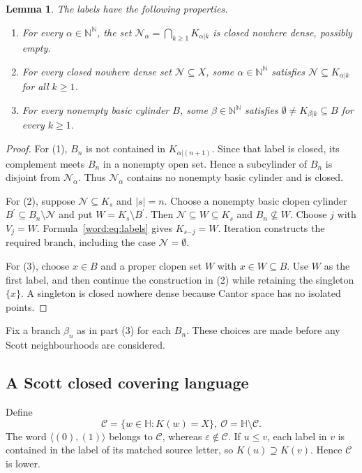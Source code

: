 \documentclass[fleqn,preprint,3p,a4paper]{elsarticle}
\newtheorem{lemma}[theorem]{Lemma}
\theoremstyle{definition}
\newcommand{\N}{\mathbb N}
\newcommand{\HH}{\mathbb H}
\begin{document}
\begin{lemma}\label{word:lem:labels}
The labels have the following properties.
\begin{enumerate}[\rm (1)]
\item For every $\alpha\in\N^\N$, the set
      $\mathcal N_\alpha=\bigcap_{k\geq1}K_{\alpha|k}$ is closed nowhere dense, possibly empty.
\item For every closed nowhere dense set $\mathcal N\subseteq X$, some $\alpha\in\N^\N$ satisfies
      $\mathcal N\subseteq K_{\alpha|k}$ for all $k\geq1$.
\item For every nonempty basic cylinder $B$, some $\beta\in\N^\N$ satisfies
      $\emptyset\neq K_{\beta|k}\subseteq B$ for every $k\geq1$.
\end{enumerate}
\end{lemma}
\begin{proof}
For (1), $B_n$ is not contained in $K_{\alpha|(n+1)}$. Since that label is closed, its complement meets $B_n$ in a nonempty open set. Hence a subcylinder of $B_n$ is disjoint from $\mathcal N_\alpha$. Thus $\mathcal N_\alpha$ contains no nonempty basic cylinder and is closed.

For (2), suppose $\mathcal N\subseteq K_s$ and $|s|=n$. Choose a nonempty basic clopen cylinder $B^\prime\subseteq B_n\setminus\mathcal N$ and put $W=K_s\setminus B^\prime$. Then $\mathcal N\subseteq W\subseteq K_s$ and $B_n\not\subseteq W$. Choose $j$ with $V_j=W$. Formula~\eqref{word:eq:labels} gives $K_{s^\frown j}=W$. Iteration constructs the required branch, including the case $\mathcal N=\emptyset$.

For (3), choose $x\in B$ and a proper clopen set $W$ with $x\in W\subseteq B$. Use $W$ as the first label, and then continue the construction in (2) while retaining the singleton $\{x\}$. A singleton is closed nowhere dense because Cantor space has no isolated points.
\end{proof}
Fix a branch $\beta_n$ as in part (3) for each $B_n$. These choices are made before any Scott neighbourhoods are considered.

\subsection{A Scott closed covering language}
Define
\begin{equation}\label{word:eq:cover}
 \mathcal C=\{w\in\HH:K(w)=X\},
 ~
 \mathcal O=\HH\setminus\mathcal C.
\end{equation}
The word $\langle(0),(1)\rangle$ belongs to $\mathcal C$, whereas $\varepsilon\notin\mathcal C$. If $u\leq v$, each label in $v$ is contained in the label of its matched source letter, so $K(u)\supseteq K(v)$. Hence $\mathcal C$ is lower.
\end{document}

